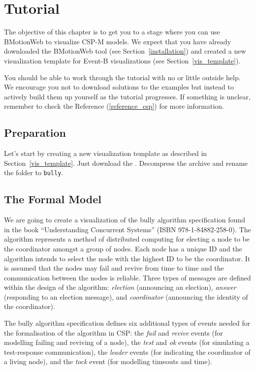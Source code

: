 \section{Tutorial}
\label{tutorial_csp}

The objective of this chapter is to get you to a stage where you can use BMotionWeb to visualize CSP-M models. 
We expect that you have already downloaded the BMotionWeb tool (see Section~\ref{installation}) and created a new visualization template for Event-B visualizations (see Section~\ref{vis_template}).
 
You should be able to work through the tutorial with no or little outside help.
We encourage you not to download solutions to the examples but instead to actively build them up yourself as the tutorial progresses.
If something is unclear, remember to check the Reference (\ref{reference_csp}) for more information.

\subsection{Preparation}

Let's start by creating a new visualization template as described in Section~\ref{vis_template}.
Just download the .
Decompress the archive and rename the folder to \texttt{bully}.

\subsection{The Formal Model}

We are going to create a visualization of the bully algorithm specification found in the book ``Understanding Concurrent Systems'' (ISBN 978-1-84882-258-0).
The algorithm represents a method of distributed computing for electing a node to be the coordinator amongst a group of nodes.
Each node has a unique ID and the algorithm intends to select the node with the highest ID to be the coordinator.
It is assumed that the nodes may fail and revive from time to time and the communication between the nodes is reliable.
Three types of messages are defined within the design of the algorithm: \textit{election} (announcing an election), \textit{answer} (responding to an election message), and \textit{coordinator} (announcing the identity of the coordinator).

The bully algorithm specification defines six additional types of events needed for the formalisation of the algorithm in CSP:
the \textit{fail} and \textit{revive} events (for modelling failing and reviving of a node), the \textit{test} and \textit{ok} events (for simulating a test-response communication), the \textit{leader} events (for indicating the coordinator of a living node), and the \textit{tock} event (for modelling timeouts and time).

